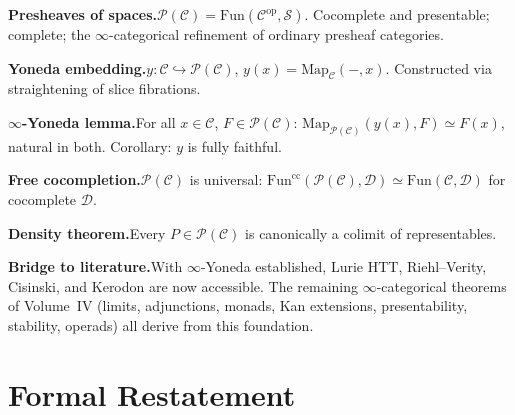 \begin{summarybox}
\textbf{Presheaves of spaces.}\quad $\mathcal{P}(\mathcal{C}) =
\mathrm{Fun}(\mathcal{C}^{\mathrm{op}}, \mathcal{S})$. Cocomplete and
presentable; complete; the $\infty$-categorical refinement of ordinary
presheaf categories.

\textbf{Yoneda embedding.}\quad $y : \mathcal{C} \hookrightarrow
\mathcal{P}(\mathcal{C})$, $y(x) = \mathrm{Map}_\mathcal{C}(-, x)$.
Constructed via straightening of slice fibrations.

\textbf{$\infty$-Yoneda lemma.}\quad For all $x \in \mathcal{C}$, $F \in
\mathcal{P}(\mathcal{C})$:
$\mathrm{Map}_{\mathcal{P}(\mathcal{C})}(y(x), F) \simeq F(x)$,
natural in both. Corollary: $y$ is fully faithful.

\textbf{Free cocompletion.}\quad $\mathcal{P}(\mathcal{C})$ is universal:
$\mathrm{Fun}^{\mathrm{cc}}(\mathcal{P}(\mathcal{C}), \mathcal{D}) \simeq
\mathrm{Fun}(\mathcal{C}, \mathcal{D})$ for cocomplete $\mathcal{D}$.

\textbf{Density theorem.}\quad Every $P \in \mathcal{P}(\mathcal{C})$ is
canonically a colimit of representables.

\textbf{Bridge to literature.}\quad With $\infty$-Yoneda established,
Lurie HTT, Riehl–Verity, Cisinski, and Kerodon are now accessible. The
remaining $\infty$-categorical theorems of Volume~IV (limits,
adjunctions, monads, Kan extensions, presentability, stability, operads)
all derive from this foundation.
\end{summarybox}


\section*{Formal Restatement}

